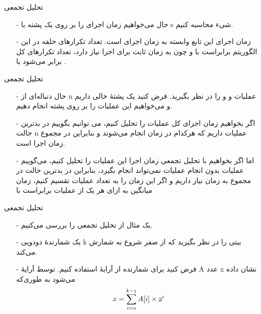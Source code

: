 \begin{frame}{‌تحلیل تجمعی}
\begin{itemize}\itemr
\item[-]
حال می‌خواهیم زمان اجرای
را بر روی یک پشته با s شیء محاسبه کنیم.
\item[-]
زمان اجرای این تابع وابسته به زمان اجرای
است. تعداد تکرارهای حلقه در این الگوریتم برابراست با
و چون
به زمان ثابت برای اجرا نیاز دارد، تعداد تکرارهای کل برابر می‌شود با
.
\end{itemize}
\end{frame}


\begin{frame}{‌تحلیل تجمعی}
\begin{itemize}\itemr
\item[-]
حال دنباله‌ای از n عملیات
و
و
را در نظر بگیرید. فرض کنید یک پشتهٔ خالی داریم و می‌خواهیم این عملیات را بر روی پشته انجام دهیم.
\item[-]
اگر بخواهیم زمان اجرای کل عملیات را تحلیل کنیم، می توانیم بگوییم در بدترین حالت n عملیات
داریم که هرکدام در زمان
انجام می‌شوند و بنابراین در مجموع زمان اجرا
است.
\item[-]
اما اگر بخواهیم با تحلیل تجمعی زمان اجرا این عملیات را تحلیل کنیم، می‌گوییم عملیات
بدون انجام عملیات
نمی‌تواند انجام بگیرد، بنابراین در بدترین حالت در مجموع به
زمان نیاز داریم و اگر این زمان را به تعداد عملیات تقسیم کنیم، زمان میانگین به ازای هر یک از عملیات برابراست با
\end{itemize}
\end{frame}
\fi

\begin{frame}{‌تحلیل تجمعی}
\begin{itemize}\itemr
\item[-]
یک مثال از تحلیل تجمعی را بررسی می‌کنیم.
\item[-]
یک شمارندهٔ دودویی k بیتی را در نظر بگیرید که از صفر شروع به شمارش می‌کند.
\item[-]
فرض کنید برای شمارنده از آرایهٔ
استفاده کنیم. توسط آرایهٔ A عدد x نشان داده می‌شود به طوری‌که
\begin{align*}
\mathnormal{x = \sum_{i = 0}^{k-1} A[i] \times 2^i}
\end{align*}
\end{itemize}
\end{frame}


